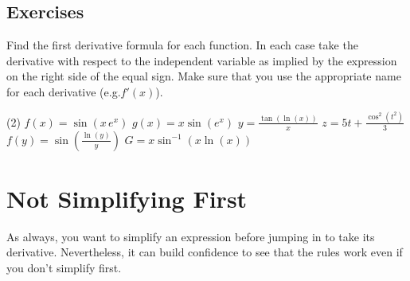 \documentclass[10pt,oneside,]{book}
\theoremstyle{plain}
\theoremstyle{definition}
\numberwithin{equation}{section}
\newcommand{\fe}[2]{#1\mathopen{}\left(#2\right)\mathclose{}}
\newcommand{\fd}[1]{#1'}
\begin{document}
\subsection[Exercises]{Exercises}\label{exercises-44}
Find the first derivative formula for each function.  In each case take the derivative with respect to the independent variable as implied by the expression on the right side of the equal sign.  Make sure that you use the appropriate name for each derivative (e.g.\@ \(\fe{\fd{f}}{x}\)).%
\par
\begin{exercisegroup}(2)
\exercise[1.]\hypertarget{exercise-455}{\null}\(\fe{f}{x}=\fe{\sin}{x\,e^x}\)%
\exercise[2.]\hypertarget{exercise-456}{\null}\(\fe{g}{x}=x\fe{\sin}{e^x}\)%
\exercise[3.]\hypertarget{exercise-457}{\null}\(y=\frac{\fe{\tan}{\fe{\ln}{x}}}{x}\)%
\exercise[4.]\hypertarget{exercise-458}{\null}\(z=5t+\frac{\fe{\cos^2}{t^2}}{3}\)%
\exercise[5.]\hypertarget{exercise-459}{\null}\(\fe{f}{y}=\fe{\sin}{\frac{\fe{\ln}{y}}{y}}\)%
\exercise[6.]\hypertarget{exercise-460}{\null}\(G=x\fe{\sin^{-1}}{x\fe{\ln}{x}}\)%
\end{exercisegroup}
\par\smallskip\noindent
\typeout{************************************************}
\typeout{************************************************}
\section[Not Simplifying First]{Not Simplifying First}\label{section-not-simplifying-first}
As always, you want to simplify an expression before jumping in to take its derivative.  Nevertheless, it can build confidence to see that the rules work even if you don't simplify first.%
\typeout{************************************************}
\typeout{************************************************}
\end{document}
